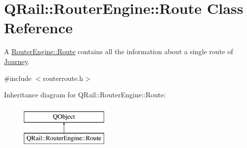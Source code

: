 \hypertarget{classQRail_1_1RouterEngine_1_1Route}{}\section{Q\+Rail\+::Router\+Engine\+::Route Class Reference}
\label{classQRail_1_1RouterEngine_1_1Route}


A \mbox{\hyperlink{classQRail_1_1RouterEngine_1_1Route}{Router\+Engine\+::\+Route}} contains all the information about a single route of \mbox{\hyperlink{classQRail_1_1RouterEngine_1_1Journey}{Journey}}.  




{\ttfamily \#include $<$routerroute.\+h$>$}

Inheritance diagram for Q\+Rail\+::Router\+Engine\+::Route\+:\begin{figure}[H]
\begin{center}
\leavevmode
\includegraphics[height=2.000000cm]{classQRail_1_1RouterEngine_1_1Route}
\end{center}
\end{figure}
